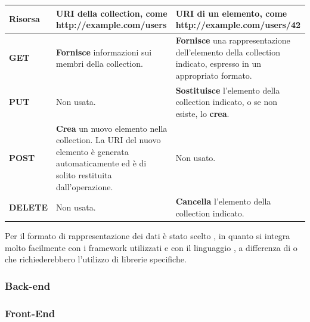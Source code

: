 \begin{tabularx}{\textwidth}{|X|X|X|}
\hline
\textbf{Risorsa} & URI della collection, come http://example.com/users & URI di un elemento, come http://example.com/users/42 \\
\hline
\textbf{GET} & \textbf{Fornisce} informazioni sui membri della collection. & \textbf{Fornisce} una rappresentazione dell'elemento della collection indicato, espresso in un appropriato formato. \\
\hline
\textbf{PUT} & Non usata. & \textbf{Sostituisce} l'elemento della collection indicato, o se non esiste, lo \textbf{crea}. \\
\hline
\textbf{POST} & \textbf{Crea} un nuovo elemento nella collection. La URI del nuovo elemento è generata automaticamente ed è di solito restituita dall'operazione. & Non usato. \\
\hline
\textbf{DELETE} & Non usata. & \textbf{Cancella} l'elemento della collection indicato. \\
\hline
\end{tabularx}

Per il formato di rappresentazione dei dati è stato scelto , in quanto si integra molto facilmente con i framework utilizzati e con il linguaggio , a differenza di  o  che richiederebbero l'utilizzo di librerie specifiche.


\subsubsection{Back-end}

\subsubsection{Front-End}